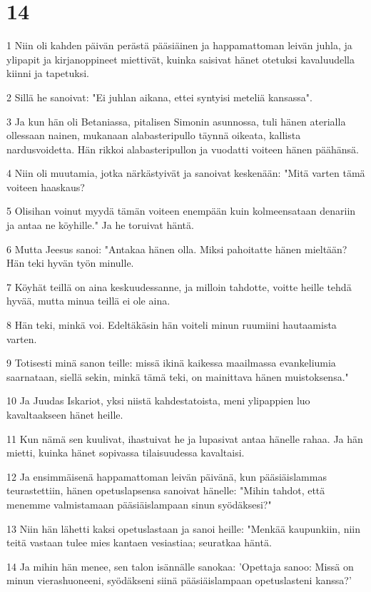 \chapter{14}

\par 1 Niin oli kahden päivän perästä pääsiäinen ja happamattoman leivän juhla, ja ylipapit ja kirjanoppineet miettivät, kuinka saisivat hänet otetuksi kavaluudella kiinni ja tapetuksi.
\par 2 Sillä he sanoivat: "Ei juhlan aikana, ettei syntyisi meteliä kansassa".
\par 3 Ja kun hän oli Betaniassa, pitalisen Simonin asunnossa, tuli hänen aterialla ollessaan nainen, mukanaan alabasteripullo täynnä oikeata, kallista nardusvoidetta. Hän rikkoi alabasteripullon ja vuodatti voiteen hänen päähänsä.
\par 4 Niin oli muutamia, jotka närkästyivät ja sanoivat keskenään: "Mitä varten tämä voiteen haaskaus?
\par 5 Olisihan voinut myydä tämän voiteen enempään kuin kolmeensataan denariin ja antaa ne köyhille." Ja he toruivat häntä.
\par 6 Mutta Jeesus sanoi: "Antakaa hänen olla. Miksi pahoitatte hänen mieltään? Hän teki hyvän työn minulle.
\par 7 Köyhät teillä on aina keskuudessanne, ja milloin tahdotte, voitte heille tehdä hyvää, mutta minua teillä ei ole aina.
\par 8 Hän teki, minkä voi. Edeltäkäsin hän voiteli minun ruumiini hautaamista varten.
\par 9 Totisesti minä sanon teille: missä ikinä kaikessa maailmassa evankeliumia saarnataan, siellä sekin, minkä tämä teki, on mainittava hänen muistoksensa."
\par 10 Ja Juudas Iskariot, yksi niistä kahdestatoista, meni ylipappien luo kavaltaakseen hänet heille.
\par 11 Kun nämä sen kuulivat, ihastuivat he ja lupasivat antaa hänelle rahaa. Ja hän mietti, kuinka hänet sopivassa tilaisuudessa kavaltaisi.
\par 12 Ja ensimmäisenä happamattoman leivän päivänä, kun pääsiäislammas teurastettiin, hänen opetuslapsensa sanoivat hänelle: "Mihin tahdot, että menemme valmistamaan pääsiäislampaan sinun syödäksesi?"
\par 13 Niin hän lähetti kaksi opetuslastaan ja sanoi heille: "Menkää kaupunkiin, niin teitä vastaan tulee mies kantaen vesiastiaa; seuratkaa häntä.
\par 14 Ja mihin hän menee, sen talon isännälle sanokaa: 'Opettaja sanoo: Missä on minun vierashuoneeni, syödäkseni siinä pääsiäislampaan opetuslasteni kanssa?'

